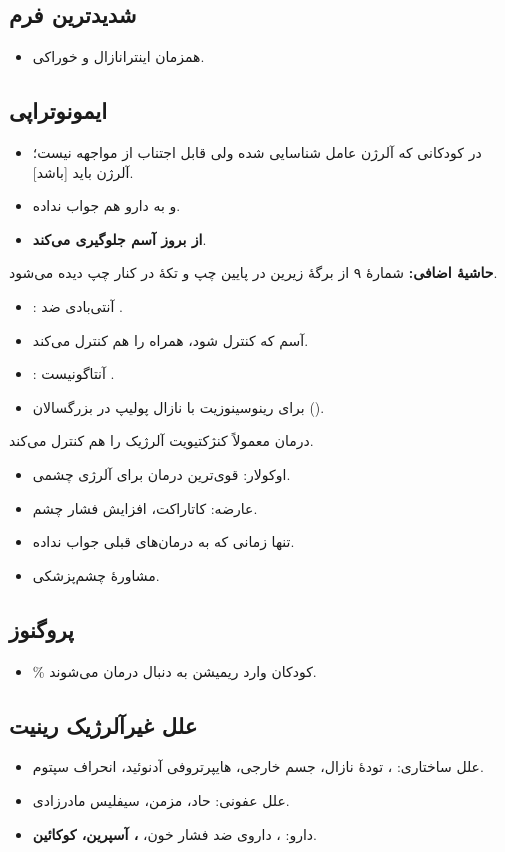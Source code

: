 \documentclass[12pt,a4paper]{article}
\begin{document}
\subsection*{شدیدترین فرم }
\begin{itemize}
\item همزمان  اینترانازال و  خوراکی.
\end{itemize}
\subsection*{ایمونوتراپی}
\begin{itemize}
\item در کودکانی که آلرژن عامل  شناسایی شده ولی قابل اجتناب از مواجهه نیست؛ آلرژن باید  [باشد].
\item و به دارو هم جواب نداده.
\item \textbf{از بروز آسم جلوگیری می‌کند}.
\end{itemize}

\textbf{حاشیهٔ اضافی:} شمارهٔ ۹ از برگهٔ زیرین در پایین چپ و تکهٔ  در کنار چپ دیده می‌شود.
\begin{itemize}
\item {}: آنتی‌بادی ضد .
\item آسم که کنترل شود،  همراه را هم کنترل می‌کند.
\item {}: آنتاگونیست .
\item {} برای رینوسینوزیت با نازال پولیپ در بزرگسالان ().
\end{itemize}
درمان  معمولاً کنژکتیویت آلرژیک را هم کنترل می‌کند.
\begin{itemize}
\item {} اوکولار: قوی‌ترین درمان برای آلرژی چشمی.
\item عارضه: کاتاراکت، افزایش فشار چشم.
\item تنها زمانی که به درمان‌های قبلی جواب نداده.
\item مشاورهٔ چشم‌پزشکی.
\end{itemize}
\subsection*{پروگنوز}
\begin{itemize}
\item {}\% کودکان وارد ریمیشن به دنبال درمان می‌شوند.
\end{itemize}
\subsection*{علل غیرآلرژیک رینیت}
\begin{itemize}
\item علل ساختاری: ، تودهٔ نازال، جسم خارجی، هایپرتروفی آدنوئید، انحراف سپتوم.
\item علل عفونی: حاد، مزمن، سیفلیس مادرزادی.
\item دارو: ، داروی ضد فشار خون، \textbf{، آسپرین، کوکائین}.
\end{itemize}
\end{document}
